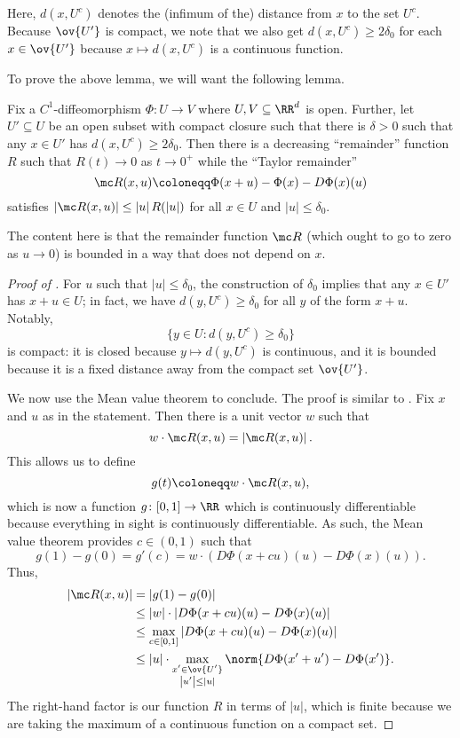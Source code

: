 \documentclass[../notes.tex]{subfiles}
\begin{document}
\begin{remark}
	Here, $d(x,U^c)$ denotes the (infimum of the) distance from $x$ to the set $U^c$. Because $\ov{U'}$ is compact, we note that we also get $d(x,U^c)\ge2\delta_0$ for each $x\in\ov{U'}$ because $x\mapsto d(x,U^c)$ is a continuous function.
\end{remark}
To prove the above lemma, we will want the following lemma.
\begin{lemma} \label{lem:uniform-c1}
	Fix a $C^1$-diffeomorphism $\Phi\colon U\to V$ where $U,V\subseteq\RR^d$ is open. Further, let $U'\subseteq U$ be an open subset with compact closure such that there is $\delta>0$ such that any $x\in U'$ has $d(x,U^c)\ge2\delta_0$. Then there is a decreasing ``remainder'' function $R$ such that $R(t)\to0$ as $t\to0^+$ while the ``Taylor remainder''
	\[\mc R(x,u)\coloneqq\Phi(x+u)-\Phi(x)-D\Phi(x)(u)\]
	satisfies $\left|\mc R(x,u)\right|\le\left|u\right|R(\left|u\right|)$ for all $x\in U$ and $\left|u\right|\le\delta_0$.
\end{lemma}
The content here is that the remainder function $\mc R$ (which ought to go to zero as $u\to0$) is bounded in a way that does not depend on $x$.
\begin{proof}[Proof of ]
	For $u$ such that $\left|u\right|\le\delta_0$, the construction of $\delta_0$ implies that any $x\in U'$ has $x+u\in U$; in fact, we have $d(y,U^c)\ge\delta_0$ for all $y$ of the form $x+u$. Notably,
	\[\{y\in U:d(y,U^c)\ge\delta_0\}\]
	is compact: it is closed because $y\mapsto d(y,U^c)$ is continuous, and it is bounded because it is a fixed distance away from the compact set $\ov{U'}$.

	We now use the Mean value theorem to conclude. The proof is similar to . Fix $x$ and $u$ as in the statement. Then there is a unit vector $w$ such that
	\[w\cdot\mc R(x,u)=\left|\mc R(x,u)\right|.\]
	This allows us to define
	\[g(t)\coloneqq w\cdot\mc R(x,u),\]
	which is now a function $g\colon[0,1]\to\RR$ which is continuously differentiable because everything in sight is continuously differentiable. As such, the Mean value theorem provides $c\in(0,1)$ such that
	\[g(1)-g(0)=g'(c)=w\cdot(D\Phi(x+cu)(u)-D\Phi(x)(u)).\]
	Thus,
	\begin{align*}
		\left|\mc R(x,u)\right| &= \left|g(1)-g(0)\right| \\
		&\le \left|w\right|\cdot\left|D\Phi(x+cu)(u)-D\Phi(x)(u)\right| \\
		&\le \max_{c\in[0,1]}\left|D\Phi(x+cu)(u)-D\Phi(x)(u)\right| \\
		&\le \left|u\right|\cdot\max_{\substack{x'\in\ov{U'}\\\left|u'\right|\le\left|u\right|}}\norm{D\Phi(x'+u')-D\Phi(x')}.
	\end{align*}
	The right-hand factor is our function $R$ in terms of $\left|u\right|$, which is finite because we are taking the maximum of a continuous function on a compact set.
\end{proof}
\end{document}
